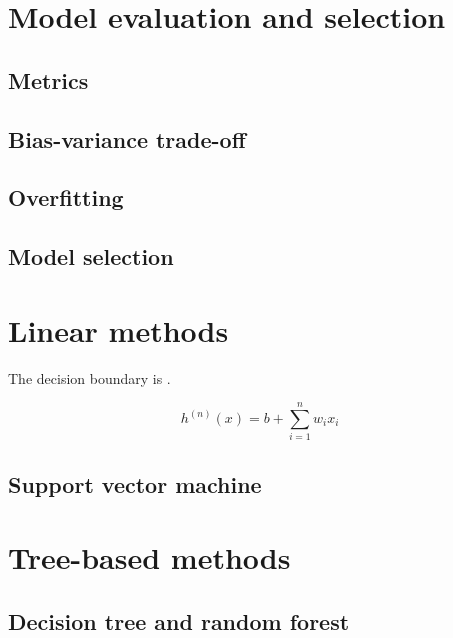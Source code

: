 \section{Model evaluation and selection}

\subsection{Metrics}

\subsection{Bias-variance trade-off}

\subsection{Overfitting}
\label{ssec:backml:overfitting}

\subsection{Model selection}

\section{Linear methods}

The decision boundary is . 

\begin{equation}
h^(n)(x) = b + \sum_{i=1}^n w_i x_i 
\end{equation} 

\subsection{Support vector machine}

\section{Tree-based methods}

\subsection{Decision tree and random forest}

